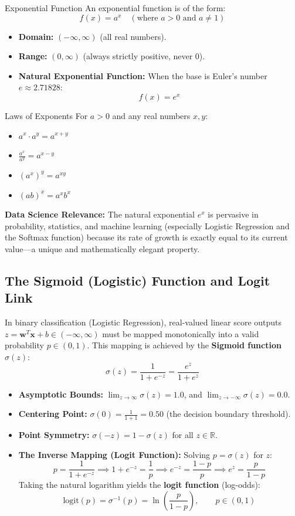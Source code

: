 \begin{definitionbox}{Exponential Function}
An exponential function is of the form:
$$f(x) = a^x \quad (\text{where } a > 0 \text{ and } a \neq 1)$$
\begin{itemize}
    \item \textbf{Domain:} $(-\infty, \infty)$ (all real numbers).
    \item \textbf{Range:} $(0, \infty)$ (always strictly positive, never $0$).
    \item \textbf{Natural Exponential Function:} When the base is Euler's number $e \approx 2.71828$:
    $$f(x) = e^x$$
\end{itemize}
\end{definitionbox}

\begin{theorembox}{Laws of Exponents}
For $a > 0$ and any real numbers $x, y$:
\begin{itemize}
    \item $a^x \cdot a^y = a^{x+y}$
    \item $\frac{a^x}{a^y} = a^{x-y}$
    \item $(a^x)^y = a^{xy}$
    \item $(ab)^x = a^x b^x$
\end{itemize}
\end{theorembox}

\textbf{Data Science Relevance:} The natural exponential $e^x$ is pervasive in probability, statistics, and machine learning (especially Logistic Regression and the Softmax function) because its rate of growth is exactly equal to its current value—a unique and mathematically elegant property.

\subsection{The Sigmoid (Logistic) Function and Logit Link}
In binary classification (Logistic Regression), real-valued linear score outputs $z = \mathbf{w}^T \mathbf{x} + b \in (-\infty, \infty)$ must be mapped monotonically into a valid probability $p \in (0, 1)$. This mapping is achieved by the \textbf{Sigmoid function} $\sigma(z)$:
$$\sigma(z) = \frac{1}{1 + e^{-z}} = \frac{e^z}{1 + e^z}$$
\begin{itemize}
    \item \textbf{Asymptotic Bounds:} $\lim_{z \to \infty} \sigma(z) = 1.0$, and $\lim_{z \to -\infty} \sigma(z) = 0.0$.
    \item \textbf{Centering Point:} $\sigma(0) = \frac{1}{1 + 1} = 0.50$ (the decision boundary threshold).
    \item \textbf{Point Symmetry:} $\sigma(-z) = 1 - \sigma(z)$ for all $z \in \mathbb{R}$.
    \item \textbf{The Inverse Mapping (Logit Function):} Solving $p = \sigma(z)$ for $z$:
    $$p = \frac{1}{1 + e^{-z}} \implies 1 + e^{-z} = \frac{1}{p} \implies e^{-z} = \frac{1 - p}{p} \implies e^z = \frac{p}{1 - p}$$
    Taking the natural logarithm yields the \textbf{logit function} (log-odds):
    $$\text{logit}(p) = \sigma^{-1}(p) = \ln\left( \frac{p}{1 - p} \right), \qquad p \in (0, 1)$$
\end{itemize}

